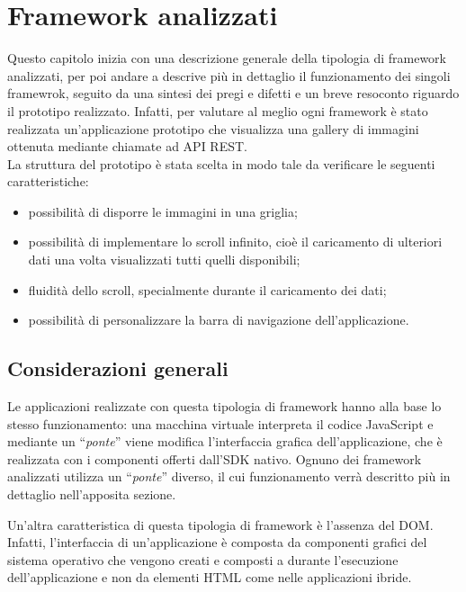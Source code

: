 
\chapter{Framework analizzati}
\label{cap:framework-analizzati}
Questo capitolo inizia con una descrizione generale della tipologia di framework analizzati, per poi andare a descrive più in dettaglio il funzionamento dei singoli framewrok, seguito da una sintesi dei pregi e difetti e un breve resoconto riguardo il prototipo realizzato.
Infatti, per valutare al meglio ogni framework è stato realizzata un'applicazione prototipo che visualizza una gallery di immagini ottenuta mediante chiamate ad API REST.\\
La struttura del prototipo è stata scelta in modo tale da verificare le seguenti caratteristiche:
\begin{itemize}
\item possibilità di disporre le immagini in una griglia;
\item possibilità di implementare lo scroll infinito, cioè il caricamento di ulteriori dati una volta visualizzati tutti quelli disponibili;
\item fluidità dello scroll, specialmente durante il caricamento dei dati;
\item possibilità di personalizzare la barra di navigazione dell'applicazione.
\end{itemize}


\section{Considerazioni generali}
Le applicazioni realizzate con questa tipologia di framework hanno alla base lo stesso funzionamento: una macchina virtuale interpreta il codice JavaScript e mediante un ``\textit{ponte}'' viene modifica l'interfaccia grafica dell'applicazione, che è realizzata con i componenti offerti dall'SDK nativo.
Ognuno dei framework analizzati utilizza un ``\textit{ponte}'' diverso, il cui funzionamento verrà descritto più in dettaglio nell'apposita sezione.

Un'altra caratteristica di questa tipologia di framework è l'assenza del DOM.
Infatti, l'interfaccia di un'applicazione è composta da componenti grafici del sistema operativo che vengono creati e composti a durante l'esecuzione dell'applicazione e non da elementi HTML come nelle applicazioni ibride.

